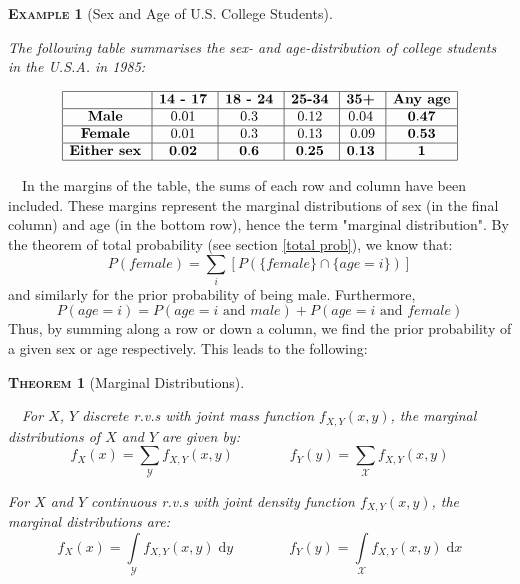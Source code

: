 \documentclass[12pt,a4paper]{article}
\newtheorem{example}{\textsc{Example}}[section]
\newtheorem{theorem}{\textsc{Theorem}}[section]
\newcommand{\diff}{\mathrm{d}}
\begin{document}
\begin{example}[Sex and Age of U.S. College Students]$\;$\par
\vspace{1cm}

The following table summarises the sex- and age-distribution of college students in the U.S.A. in 1985:

\begin{center}
$$\begin{array}{|c|c|c|c|c|c|} \hline
\quad & \textbf{14 - 17} \; & \textbf{18 - 24} \; & \textbf{25-34} \; & \textbf{35+}\; & \mbox{{\bf Any age}}\\ \hline
\text{{\bf Male}}\; & 0.01\; & 0.3\; & 0.12\; & 0.04\; & \mathbf{0.47} \\ \hline
\mbox{{\bf Female}}\; & 0.01\; & 0.3\; & 0.13\; & 0.09 & \mathbf{0.53}\\ \hline
\mbox{{\bf Either sex}}\; & \mathbf{0.02}\; & \mathbf{0.6}\; & \mathbf{0.25} \; & \mathbf{0.13}\; & \mathbf{1}\\ \hline
\end{array}$$
\end{center}

\end{example}
$\quad$In the margins of the table, the sums of each row and column have been included. These margins represent the marginal distributions of sex (in the final column) and age (in the bottom row), hence the term "marginal distribution". By the theorem of total probability (see section \ref{total prob}), we know that:
$$P(female) = \sum\limits_i [P(\{female\} \cap \{age = i\})]$$
and similarly for the prior probability of being male. Furthermore,
$$P(age = i) = P(age = i \text{ and } male) +P(age = i \text{ and } female)$$
Thus, by summing along a row or down a column, we find the prior probability of a given sex or age respectively. This leads to the following:

\begin{theorem}[Marginal Distributions]$\quad$\par
\vspace{1cm}

$\quad$For $X$, $Y$ discrete r.v.s with joint mass function $f_{X,Y}(x,y)$, the marginal distributions of $X$ and $Y$ are given by:
$$f_X(x) = \sum\limits_{\mathcal{Y}} f_{X,Y}(x,y) \qquad\qquad f_Y(y) = \sum\limits_{\mathcal{X}} f_{X,Y}(x,y)$$

For $X$ and $Y$ continuous r.v.s with joint density function $f_{X,Y}(x,y)$, the marginal distributions are:
$$f_X(x) = \int\limits_{\mathcal{Y}}\!\! f_{X,Y}(x,y)\; \diff y \qquad\qquad f_Y(y) = \int\limits_{\mathcal{X}} \!\! f_{X,Y}(x,y)\; \diff x$$

\end{theorem}
\end{document}

